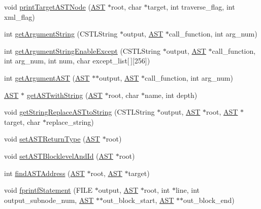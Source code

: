 \begin{DoxyCompactItemize}
\item 
void \hyperlink{AST_8h_a8108df6d563a7c093e9588516570985c}{printTargetASTNode} (\hyperlink{structabstract__syntax__tree}{AST} $\ast$root, char $\ast$target, int traverse\_\-flag, int xml\_\-flag)
\item 
int \hyperlink{AST_8h_ace68f2bec503521e64c39532d613ea62}{getArgumentString} (CSTLString $\ast$output, \hyperlink{structabstract__syntax__tree}{AST} $\ast$call\_\-function, int arg\_\-num)
\item 
int \hyperlink{AST_8h_a03abb7f464291ab69e8df4c602a8753b}{getArgumentStringEnableExcept} (CSTLString $\ast$output, \hyperlink{structabstract__syntax__tree}{AST} $\ast$call\_\-function, int arg\_\-num, int num, char except\_\-list\mbox{[}$\,$\mbox{]}\mbox{[}256\mbox{]})
\item 
int \hyperlink{AST_8h_a8aa84b5f68b049ebdd94dec829e20a59}{getArgumentAST} (\hyperlink{structabstract__syntax__tree}{AST} $\ast$$\ast$output, \hyperlink{structabstract__syntax__tree}{AST} $\ast$call\_\-function, int arg\_\-num)
\item 
\hyperlink{structabstract__syntax__tree}{AST} $\ast$ \hyperlink{AST_8h_a8726d22620bc29bb1e2ecb7d758a93d7}{getASTwithString} (\hyperlink{structabstract__syntax__tree}{AST} $\ast$root, char $\ast$name, int depth)
\item 
void \hyperlink{AST_8h_a1e2810561a1a010a204fa94f58abf36c}{getStringReplaceASTtoString} (CSTLString $\ast$output, \hyperlink{structabstract__syntax__tree}{AST} $\ast$root, \hyperlink{structabstract__syntax__tree}{AST} $\ast$target, char $\ast$replace\_\-string)
\item 
void \hyperlink{AST_8h_a49fd8ff67359b56838fbbca1519663a5}{setASTReturnType} (\hyperlink{structabstract__syntax__tree}{AST} $\ast$root)
\item 
void \hyperlink{AST_8h_a6a198cd34913f8f3500c12101db0e677}{setASTBlocklevelAndId} (\hyperlink{structabstract__syntax__tree}{AST} $\ast$root)
\item 
int \hyperlink{AST_8h_ad1a9d15070cb0f682561950d366f9d68}{findASTAddress} (\hyperlink{structabstract__syntax__tree}{AST} $\ast$root, \hyperlink{structabstract__syntax__tree}{AST} $\ast$target)
\item 
void \hyperlink{AST_8h_a7b0bdcf6415bdc3285dce22ecdfd32bd}{fprintfStatement} (FILE $\ast$output, \hyperlink{structabstract__syntax__tree}{AST} $\ast$root, int $\ast$line, int output\_\-subnode\_\-num, \hyperlink{structabstract__syntax__tree}{AST} $\ast$$\ast$out\_\-block\_\-start, \hyperlink{structabstract__syntax__tree}{AST} $\ast$$\ast$out\_\-block\_\-end)
\end{DoxyCompactItemize}


